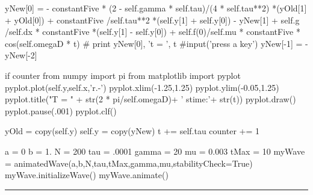 \begin{codeexample}
\begin{VerbatimOut}{\listingFile}
            yNew[0] =    - constantFive * (2 - self.gamma * self.tau)/(4 * self.tau**2) *(yOld[1] + yOld[0])  +   constantFive /self.tau**2 *(self.y[1] + self.y[0]) - yNew[1] + self.g /self.dx * constantFive *(self.y[1] - self.y[0]) +  self.f(0)/self.mu * constantFive * cos(self.omegaD * t)
            #            print yNew[0], 't = ', t
            #input('press a key')
            yNew[-1] = -yNew[-2]

            if counter %
                from numpy import pi
                from matplotlib import pyplot
                pyplot.plot(self.y,self.x,'r.-')
                pyplot.xlim(-1.25,1.25)
                pyplot.ylim(-0.05,1.25)
                pyplot.title("T = " + str(2 * pi/self.omegaD)+  ' s\n time:'+ str(t))
                pyplot.draw()
                pyplot.pause(.001)
                pyplot.clf()



            yOld = copy(self.y)
            self.y = copy(yNew)
            t += self.tau
            counter += 1

a = 0
b = 1.
N = 200
tau = .0001
gamma = 20
mu = 0.003
tMax = 10
myWave = animatedWave(a,b,N,tau,tMax,gamma,mu,stabilityCheck=True)
myWave.initializeWave()
myWave.animate()
\end{VerbatimOut}
\end{codeexample}
\else
\noindent\rule{5 in}{0.01 in}
\fi

